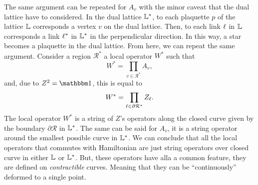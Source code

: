 The same argument can be repeated for $A_v$ with the minor caveat that the dual lattice have to considered.
In the dual lattice $\mathbb{L}^{\ast}$, to each plaquette $p$ of the lattice $\mathbb{L}$ corresponds a vertex $v$ on the dual lattice.
Then, to each link $\ell$ in $\mathbb{L}$ corresponds a link $\ell^{\ast}$ in $\mathbb{L}^{\ast}$ in the perpendicular direction.
In this way, a star becomes a plaquette in the dual lattice.
From here, we can repeat the same argument.
Consider a region $\mathcal{R}^{\ast}$ a local operator $W^{\ast}$ such that
\begin{equation}
    W^{\ast} = \prod_{v \in \mathcal{R}^{\ast}} A_v,
\end{equation}
and, due to $Z^2 = \identity$, this is equal to
\begin{equation}
    W^{\ast} = \prod_{\ell \in \partial \mathcal{R}^{\ast}} Z_{\ell}.
\end{equation}
The local operator $W^{\ast}$ is a string of $Z$'s operators along the closed curve given by the boundary $\partial \mathcal{R}$ in $\mathbb{L}^{\ast}$.
The same can be said for $A_v$, it is a string operator around the smallest possible curve in $\mathbb{L}^{\ast}$.
We can conclude that all the local operators that commutes with Hamiltonian are just string operators over closed curve in either $\mathbb{L}$ or $\mathbb{L}^{\ast}$.
But, these operators have alla a common feature, they are defined on \emph{contractible} curves.
Meaning that they can be ``continuously'' deformed to a single point.

\begin{figure}[t]
\end{figure}


